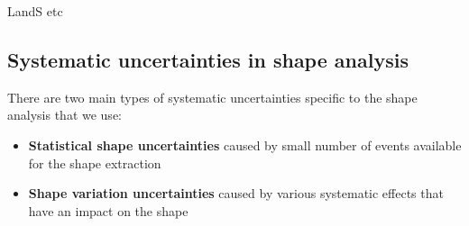 LandS etc

\subsection{Systematic uncertainties in shape analysis} 

There are two main types of systematic uncertainties specific to the
shape analysis that we use:
\begin{itemize}
  \item {\bf Statistical shape uncertainties} caused by small number of events available for the shape extraction
  \item {\bf Shape variation uncertainties} caused by various systematic effects that have an impact on the shape
\end{itemize}

